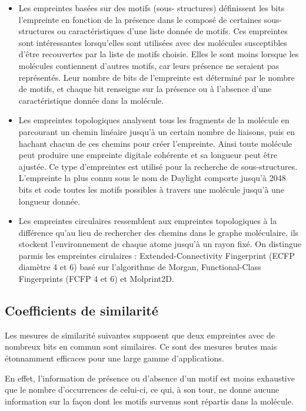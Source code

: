\begin{itemize}
\item Les empreintes basées sur des motifs (sous- structures) définissent les bits l'empreinte en fonction de la présence dans le composé de certaines sous-structures ou caractéristiques d'une liste donnée de motifs. Ces empreintes sont intéressantes lorsqu'elles sont utilisées avec des molécules susceptibles d'être recouvertes par la liste de motifs choisie. Elles le sont moins lorsque les molécules contiennent d'autres motifs, car leurs présence ne seraient pas représentés. Leur nombre de bits de l'empreinte est déterminé par le nombre de motifs, et chaque bit renseigne sur la présence ou à l'absence d'une caractéristique donnée dans la molécule. %

\item Les empreintes topologiques analysent tous les fragments de la molécule en parcourant un chemin linéaire jusqu’à un certain nombre de liaisons, puis en hachant chacun de ces chemins pour créer l’empreinte. Ainsi toute molécule peut produire une empreinte digitale cohérente et sa longueur peut être ajustée. Ce type d'empreintes est utilisé pour la recherche de sous-structures. L’empreinte la plus connu sous le nom de Daylight \cite{} comporte jusqu'à 2048 bits et code toutes les motifs possibles à travers une molécule jusqu'à une longueur donnée.

\item Les empreintes circulaires ressemblent aux empreintes topologiques à la différence qu'au lieu de rechercher des chemins dans le graphe moléculaire, ils stockent l'environnement de chaque atome jusqu'à un rayon fixé. On distingue parmis les empreintes cirulaires : Extended-Connectivity Fingerprint (ECFP diamètre $4$ et $6$) basé sur l'algorithme de Morgan, Functional-Class Fingerprints (FCFP $4$ et $6$) et Molprint2D.

\end{itemize}
\subsection{Coefficients de similarité}
Les mesures de similarité suivantes supposent que deux empreintes avec de nombreux bits en commun sont similaires. Ce sont des mesures brutes mais étonnamment efficaces pour une large gamme d'applications.

En effet, l'information de présence ou d'absence d'un motif est moins exhaustive que le nombre d'occurrences de celui-ci, ce qui, à son tour, ne donne aucune information sur la façon dont les motifs survenus sont répartis dans la molécule. %

